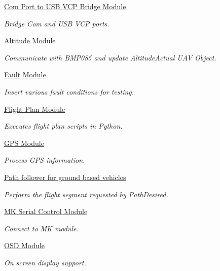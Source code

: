 \begin{DoxyCompactItemize}
\hyperlink{group___com_usb_bridge_module}{Com Port to U\-S\-B V\-C\-P Bridge Module}
\begin{DoxyCompactList}\small\item\em Bridge Com and U\-S\-B V\-C\-P ports. \end{DoxyCompactList}\item 
\hyperlink{group___altitude_module}{Altitude Module}
\begin{DoxyCompactList}\small\item\em Communicate with B\-M\-P085 and update Altitude\-Actual U\-A\-V Object. \end{DoxyCompactList}\item 
\hyperlink{group___fault_module}{Fault Module}
\begin{DoxyCompactList}\small\item\em Insert various fault conditions for testing. \end{DoxyCompactList}\item 
\hyperlink{group___flight_plan}{Flight Plan Module}
\begin{DoxyCompactList}\small\item\em Executes flight plan scripts in Python. \end{DoxyCompactList}\item 
\hyperlink{group___g_s_p_module}{G\-P\-S Module}
\begin{DoxyCompactList}\small\item\em Process G\-P\-S information. \end{DoxyCompactList}\item 
\hyperlink{group___ground_path_follower}{Path follower for ground based vehicles}
\begin{DoxyCompactList}\small\item\em Perform the flight segment requested by Path\-Desired. \end{DoxyCompactList}\item 
\hyperlink{group___m_k_serial_module}{M\-K Serial Control Module}
\begin{DoxyCompactList}\small\item\em Connect to M\-K module. \end{DoxyCompactList}\item 
\hyperlink{group___o_s_d_module}{O\-S\-D Module}
\begin{DoxyCompactList}\small\item\em On screen display support. \end{DoxyCompactList}\item 

\end{DoxyCompactItemize}
